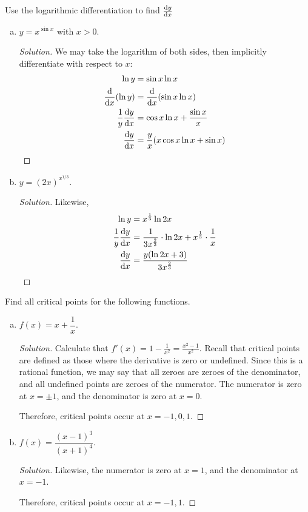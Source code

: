 \documentclass{agony}
\begin{document}
\question Use the logarithmic differentiation to find $\dv{y}{x}$
\begin{enumerate}[(a)]
  \item $y=x^{\sin x}$ with $x > 0$.
        \begin{proof}[Solution]
          We may take the logarithm of both sides,
          then implicitly differentiate with respect to $x$:
          \begin{align*}
            \ln y           & = \sin x \ln x                                \\
            \dv{x}(\ln y)   & = \dv{x}(\sin x \ln x)                        \\
            \frac{1}{y}\dv{y}{x} & = \cos x\ln x + \frac{\sin x}{x}              \\
            \dv{y}{x}            & = \frac{y}{x}(x\cos x\ln x + \sin x) \qedhere
          \end{align*}

        \end{proof}
  \item $y=(2x)^{x^{1/3}}$.
        \begin{proof}[Solution]
          Likewise,
          \begin{align*}
            \ln y       & = x^{\frac13}\ln 2x                                                 \\
            \frac1y\dv{y}{x} & = \frac{1}{3x^{\frac23}}\cdot \ln 2x + x^{\frac13}\cdot \frac{1}{x} \\
            \dv{y}{x}        & = \frac{y(\ln 2x + 3)}{3x^{\frac23}} \qedhere
          \end{align*}
        \end{proof}
\end{enumerate}


\question Find all critical points for the following functions.
\begin{enumerate}[(a)]
  \item $f(x)=x+\dfrac{1}{x}$.
        \begin{proof}[Solution]
          Calculate that $f'(x) = 1 - \frac{1}{x^2} = \frac{x^2-1}{x^2}$.
          Recall that critical points are defined as those where the derivative is zero or undefined.
          Since this is a rational function, we may say that all zeroes are zeroes of the denominator,
          and all undefined points are zeroes of the numerator.
          The numerator is zero at $x=\pm1$, and the denominator is zero at $x=0$.

          Therefore, critical points occur at $x=-1,0,1$.
        \end{proof}
  \item $f(x)=\dfrac{(x-1)^3}{(x+1)^4}$.
        \begin{proof}[Solution]
          Likewise, the numerator is zero at $x=1$, and the denominator at $x=-1$.

          Therefore, critical points occur at $x=-1,1$.
        \end{proof}
\end{enumerate}
\end{document}
